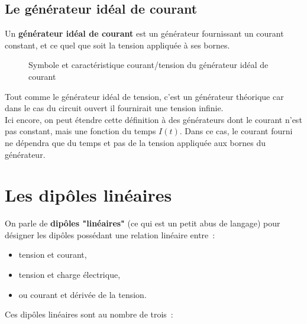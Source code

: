 \subsection{Le générateur idéal de courant }

Un \textbf{générateur idéal de courant} est un générateur fournissant un courant constant, et ce quel que soit la tension appliquée à ses bornes.

\begin{figure}[!h]
\begin{center}

\hspace{1cm}

\end{center}
\caption{ Symbole et caractéristique courant/tension du générateur idéal de courant}
\end{figure}

Tout comme le générateur idéal de tension, c'est un générateur théorique car dans le cas du circuit ouvert il fournirait une tension infinie.\\

Ici encore, on peut étendre cette définition à des générateurs dont le courant n'est pas constant, mais une fonction du temps $I(t)$. Dans ce cas, le courant fourni ne dépendra que du temps et pas de la tension appliquée aux bornes du générateur.


\section{Les dipôles linéaires }

On parle de \textbf{dipôles "linéaires"} (ce qui est un petit abus de langage) pour désigner les dipôles possédant une relation linéaire entre~:\\
\begin{itemize}
\item tension et courant, 
\item tension et charge électrique,
\item ou courant et dérivée de la tension.\\
\end{itemize}

Ces dipôles linéaires sont au nombre de trois~: \\


